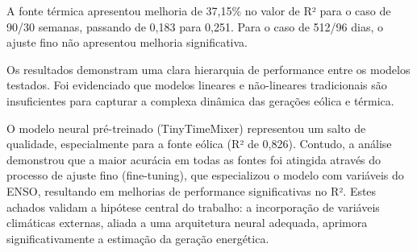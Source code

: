 A fonte térmica apresentou melhoria de 37,15\% no valor de R² para o caso de 90/30 semanas, passando de 0,183 para 0,251.
Para o caso de 512/96 dias, o ajuste fino não apresentou melhoria significativa. 

Os resultados demonstram uma clara hierarquia de performance entre os modelos testados. Foi evidenciado que modelos 
lineares e não-lineares tradicionais são insuficientes para capturar a complexa dinâmica das gerações eólica e térmica. 

O modelo neural pré-treinado (TinyTimeMixer) representou um salto de qualidade, especialmente para a fonte eólica 
(R² de 0,826). Contudo, a análise demonstrou que a maior acurácia em todas as fontes foi atingida através do processo 
de ajuste fino (fine-tuning), que especializou o modelo com variáveis do ENSO, resultando em melhorias de performance 
significativas no R². Estes achados validam a hipótese central do trabalho: a incorporação de variáveis 
climáticas externas, aliada a uma arquitetura neural adequada, aprimora significativamente a estimação da geração energética.